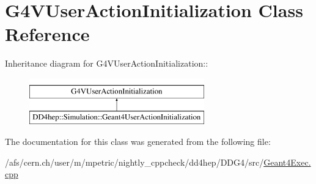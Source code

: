 \hypertarget{class_g4_v_user_action_initialization}{
\section{G4VUserActionInitialization Class Reference}
\label{class_g4_v_user_action_initialization}
}
Inheritance diagram for G4VUserActionInitialization::\begin{figure}[H]
\begin{center}
\leavevmode
\includegraphics[height=2cm]{class_g4_v_user_action_initialization}
\end{center}
\end{figure}


The documentation for this class was generated from the following file:\begin{DoxyCompactItemize}
\item 
/afs/cern.ch/user/m/mpetric/nightly\_\-cppcheck/dd4hep/DDG4/src/\hyperlink{_geant4_exec_8cpp}{Geant4Exec.cpp}\end{DoxyCompactItemize}
